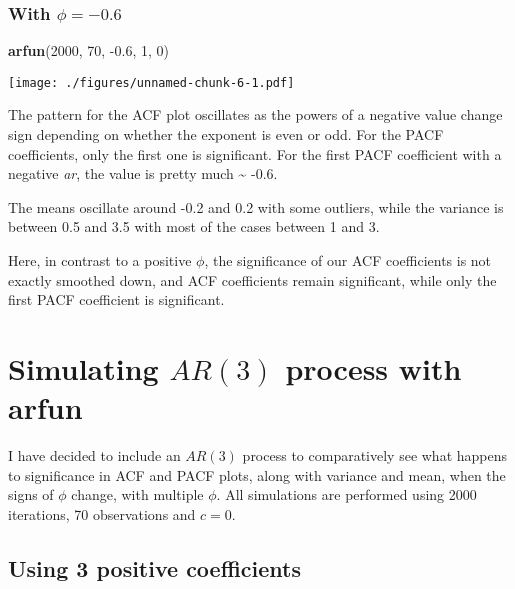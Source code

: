 \documentclass[]{article}
\newenvironment{Shaded}{\begin{snugshade}}{\end{snugshade}}
\newcommand{\DecValTok}[1]{\textcolor[rgb]{0.00,0.00,0.81}{#1}}
\newcommand{\FloatTok}[1]{\textcolor[rgb]{0.00,0.00,0.81}{#1}}
\newcommand{\KeywordTok}[1]{\textcolor[rgb]{0.13,0.29,0.53}{\textbf{#1}}}
\newcommand{\NormalTok}[1]{#1}
\begin{document}
\hypertarget{with-phi--0.6}{%
\subsubsection{\texorpdfstring{With
\(\phi = -0.6\)}{With \textbackslash{}phi = -0.6}}\label{with-phi--0.6}}

\begin{Shaded}
\begin{Highlighting}[]
\KeywordTok{arfun}\NormalTok{(}\DecValTok{2000}\NormalTok{, }\DecValTok{70}\NormalTok{, }\FloatTok{-0.6}\NormalTok{, }\DecValTok{1}\NormalTok{, }\DecValTok{0}\NormalTok{)}
\end{Highlighting}
\end{Shaded}

\texttt{[image: ./figures/unnamed-chunk-6-1.pdf]}

The pattern for the ACF plot oscillates as the powers of a negative
value change sign depending on whether the exponent is even or odd. For
the PACF coefficients, only the first one is significant. For the first
PACF coefficient with a negative \emph{ar}, the value is pretty much
\textasciitilde{} -0.6.

The means oscillate around -0.2 and 0.2 with some outliers, while the
variance is between 0.5 and 3.5 with most of the cases between 1 and 3.

Here, in contrast to a positive \(\phi\), the significance of our ACF
coefficients is not exactly smoothed down, and ACF coefficients remain
significant, while only the first PACF coefficient is significant.

\newpage

\hypertarget{simulating-ar3-process-with-arfun}{%
\section{\texorpdfstring{Simulating \(AR(3)\) process with
\textbf{arfun}}{Simulating AR(3) process with arfun}}\label{simulating-ar3-process-with-arfun}}

I have decided to include an \(AR(3)\) process to comparatively see what
happens to significance in ACF and PACF plots, along with variance and
mean, when the signs of \(\phi\) change, with multiple \(\phi\). All
simulations are performed using 2000 iterations, 70 observations and
\(c = 0\).

\hypertarget{using-3-positive-coefficients}{%
\subsection{Using 3 positive
coefficients}\label{using-3-positive-coefficients}}
\end{document}
